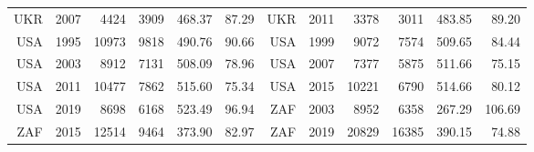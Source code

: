 {\begin{longtable}{r|r|r|r|r|r||r|r|r|r|r|r}
    UKR   & 2007  & 4424  & 3909  & 468.37 & 87.29  & UKR   & 2011  & 3378  & 3011  & 483.85 & 89.20 \\
    USA   & 1995  & 10973 & 9818  & 490.76 & 90.66  & USA   & 1999  & 9072  & 7574  & 509.65 & 84.44 \\
    USA   & 2003  & 8912  & 7131  & 508.09 & 78.96  & USA   & 2007  & 7377  & 5875  & 511.66 & 75.15 \\
    USA   & 2011  & 10477 & 7862  & 515.60 & 75.34  & USA   & 2015  & 10221 & 6790  & 514.66 & 80.12 \\
    USA   & 2019  & 8698  & 6168  & 523.49 & 96.94  & ZAF   & 2003  & 8952  & 6358  & 267.29 & 106.69 \\
    ZAF   & 2015  & 12514 & 9464  & 373.90 & 82.97  & ZAF   & 2019  & 20829 & 16385 & 390.15 & 74.88 \\
\end{longtable}
}